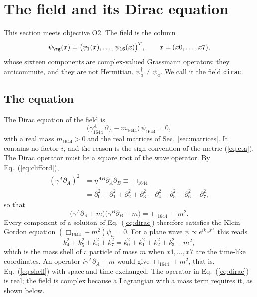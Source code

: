 
\section{The field and its Dirac equation}
\label{sec:dirac}

This section meets objective O2. The field is the column
\begin{equation}
\psi_{\tg}(x)=\big(\psi_1(x),\dots,\psi_{16}(x)\big)^T,\qquad x=(x0,\dots,x7),
\end{equation}
whose sixteen components are complex-valued Grassmann operators: they anticommute, and they are not
Hermitian, $\psi_a^\dagger\neq\psi_a$. We call it the field \texttt{dirac\tg}.

\subsection{The equation}

The Dirac equation of the field is
\begin{equation}
\big(\gamma_{1644}^A\,\partial_A-m_{1644}\big)\,\psi_{1644}=0,
\label{eq:dirac}
\end{equation}
with a real mass $m_{1644}>0$ and the real matrices of Sec.~\ref{sec:matrices}. It contains no
factor $i$, and the reason is the sign convention of the metric (\ref{eq:eta}). The Dirac operator
must be a square root of the wave operator. By Eq.~(\ref{eq:clifford}),
\begin{align}
(\gamma^A\partial_A)^2&=\eta^{AB}\partial_A\partial_B\equiv\Box_{1644}\nonumber\\
&=\partial_0^2+\partial_1^2+\partial_2^2+\partial_3^2-\partial_4^2-\partial_5^2-\partial_6^2-\partial_7^2,
\end{align}
so that
\begin{equation}
\big(\gamma^A\partial_A+m\big)\big(\gamma^B\partial_B-m\big)=\Box_{1644}-m^2 .
\label{eq:kg}
\end{equation}
Every component of a solution of Eq.~(\ref{eq:dirac}) therefore satisfies the Klein-Gordon equation
$(\Box_{1644}-m^2)\psi_a=0$. For a plane wave $\psi\propto e^{ik_Ax^A}$ this reads
\begin{equation}
k_4^2+k_5^2+k_6^2+k_7^2=k_0^2+k_1^2+k_2^2+k_3^2+m^2,
\label{eq:shell}
\end{equation}
which is the mass shell of a particle of mass $m$ when $x4,\dots,x7$ are the time-like coordinates.
An operator $i\gamma^A\partial_A-m$ would give $\Box_{1644}+m^2$, that is, Eq.~(\ref{eq:shell}) with
space and time exchanged. The operator in Eq.~(\ref{eq:dirac}) is real; the field is complex because a
Lagrangian with a mass term requires it, as shown below.

